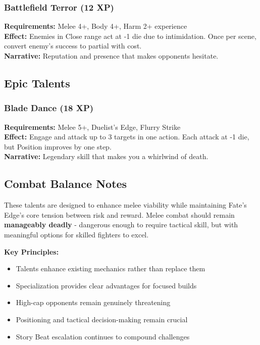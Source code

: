 \subsubsection{Battlefield Terror (12 XP)}
\textbf{Requirements:} Melee 4+, Body 4+, Harm 2+ experience \\
\textbf{Effect:} Enemies in Close range act at -1 die due to intimidation. Once per scene, convert enemy's success to partial with cost. \\
\textbf{Narrative:} Reputation and presence that makes opponents hesitate.


\subsection{Epic Talents}

\subsubsection{Blade Dance (18 XP)}
\textbf{Requirements:} Melee 5+, Duelist's Edge, Flurry Strike \\
\textbf{Effect:} Engage and attack up to 3 targets in one action. Each attack at -1 die, but Position improves by one step. \\
\textbf{Narrative:} Legendary skill that makes you a whirlwind of death.


\subsection{Combat Balance Notes}

These talents are designed to enhance melee viability while maintaining Fate's Edge's core tension between risk and reward. Melee combat should remain \textbf{manageably deadly} - dangerous enough to require tactical skill, but with meaningful options for skilled fighters to excel.

\textbf{Key Principles:}
\begin{itemize}
    \item Talents enhance existing mechanics rather than replace them
    \item Specialization provides clear advantages for focused builds
    \item High-cap opponents remain genuinely threatening
    \item Positioning and tactical decision-making remain crucial
    \item Story Beat escalation continues to compound challenges
\end{itemize}

